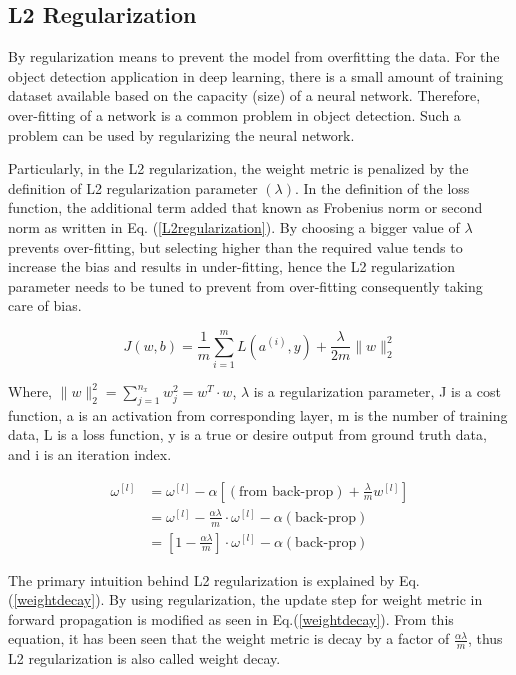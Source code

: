 \subsection{L2 Regularization}
By regularization means to prevent the model from overfitting the data. For the object detection application in deep learning, there is a small amount of training dataset available based on the capacity (size) of a neural network. Therefore, over-fitting of a network is a common problem in object detection. Such a problem can be used by regularizing the neural network. 

Particularly, in the L2 regularization, the weight metric is penalized by the definition of L2 regularization parameter $(\lambda)$. In the definition of the loss function, the additional term added that known as Frobenius norm or second norm as written in Eq. (\ref{L2regularization}). By choosing a bigger value of $\lambda$ prevents over-fitting, but selecting higher than the required value tends to increase the bias and results in under-fitting, hence the L2 regularization parameter needs to be tuned to prevent from over-fitting consequently taking care of bias.   

\begin{equation}
\label{L2regularization}
J(w, b)=\frac{1}{m} \sum_{i=1}^{m} L\left(a^{(i)}, y\right)+\frac{\lambda}{2 m}\|w\|_{2}^{2}
\end{equation}

Where, $\|w\|_{2}^{2}=\sum_{j=1}^{n_{x}} w_{j}^{2}=w^{T} \cdot w$, $\lambda$ is a regularization parameter, J is a cost function, a is an activation from corresponding layer, m is the number of training data, L is a loss function, y is a true or desire output from ground truth data, and i is an iteration index.  

\begin{equation}
\begin{aligned}
\label{weightdecay}
\omega^{[l]} &= \omega^{[l]}-\alpha\left[(\text{from back-prop})+\frac{\lambda}{m} w^{[l]}\right] \\
&=\omega^{[l]}-\frac{\alpha \lambda}{m} \cdot \omega^{[l]}-\alpha(\text {back-prop}) \\
&= [1 - \frac{\alpha \lambda}{m}] \cdot \omega^{[l]} -\alpha(\text {back-prop})
\end{aligned}
\end{equation}

The primary intuition behind L2 regularization is explained by Eq.(\ref{weightdecay}). By using regularization, the update step for weight metric in forward propagation is modified as seen in Eq.(\ref{weightdecay}). From this equation, it has been seen that the weight metric is decay by a factor of $\frac{\alpha \lambda}{m}$, thus L2 regularization is also called weight decay.


